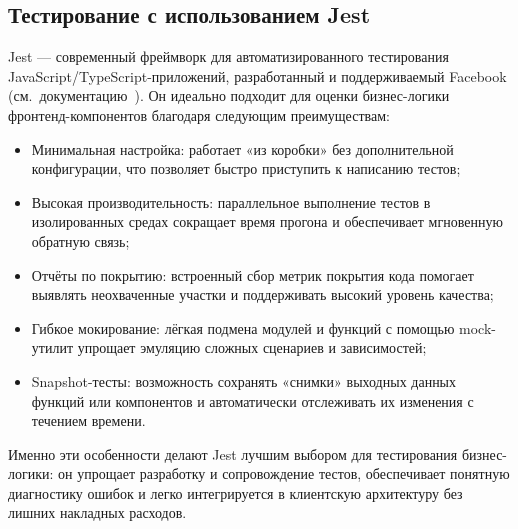 \subsection{Тестирование с использованием Jest}

Jest — современный фреймворк для автоматизированного тестирования JavaScript/TypeScript-приложений, разработанный и поддерживаемый Facebook (см.~документацию~\cite{jest_docs}). Он идеально подходит для оценки бизнес-логики фронтенд-компонентов благодаря следующим преимуществам:
\begin{itemize}
  \item Минимальная настройка: работает «из коробки» без дополнительной конфигурации, что позволяет быстро приступить к написанию тестов;
  \item Высокая производительность: параллельное выполнение тестов в изолированных средах сокращает время прогона и обеспечивает мгновенную обратную связь;
  \item Отчёты по покрытию: встроенный сбор метрик покрытия кода помогает выявлять неохваченные участки и поддерживать высокий уровень качества;
  \item Гибкое мокирование: лёгкая подмена модулей и функций с помощью mock-утилит упрощает эмуляцию сложных сценариев и зависимостей;
  \item Snapshot-тесты: возможность сохранять «снимки» выходных данных функций или компонентов и автоматически отслеживать их изменения с течением времени.
\end{itemize}

Именно эти особенности делают Jest лучшим выбором для тестирования бизнес-логики: он упрощает разработку и сопровождение тестов, обеспечивает понятную диагностику ошибок и легко интегрируется в клиентскую архитектуру без лишних накладных расходов.
